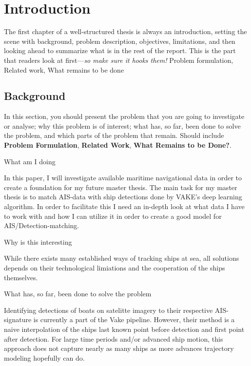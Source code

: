 \chapter{Introduction}
\label{chp:introduction}
\begin{info}
	The first chapter of a well-structured thesis is always an introduction, setting the scene with background, problem description, objectives, limitations, and then looking ahead to summarize what is in the rest of the report. This is the part that readers look at first---\emph{so make sure it hooks them!} Problem formulation, Related work, What remains to be done
\end{info}


\section{Background}
\label{sec:background}
\begin{info}
	In this section, you should present the problem that you are going to investigate or analyse; why this problem is of interest; what has, so far, been done to solve the problem, and which parts of the problem that remain. Should include \textbf{Problem Formulation}, \textbf{Related Work}, \textbf{What Remains to be Done?}.
\end{info}
\begin{info}
	What am I doing
\end{info}
In this paper, I will investigate available maritime navigational data in order to create a foundation for my future master thesis. The main task for my master thesis is to match AIS-data with ship detections done by VAKE's deep learning algorithm. In order to facilitate this I need an in-depth look at what data I have to work with and how I can utilize it in order to create a good model for AIS/Detection-matching.

\begin{info}
	Why is this interesting
\end{info}

While there exists many established ways of tracking ships at sea, all solutions depends on their technological limiations and the cooperation of the ships themselves.

\begin{info}
	What has, so far, been done to solve the problem
\end{info}
Identifying detections of boats on satelitte imagery to their respective AIS-signature is currently a part of the Vake pipeline. However, their method is a naive interpolation of the ships last known point before detection and first point after detection. For large time periods and/or advanced ship motion, this approach does not capture nearly as many ships as more advances trajectory modeling hopefully can do.

